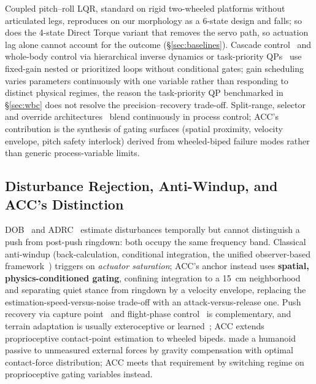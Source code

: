 \documentclass{jcd}
\begin{document}
Coupled pitch--roll LQR, standard on rigid two-wheeled platforms without articulated legs, reproduces on our morphology as a 6-state design and falls; so does the 4-state Direct Torque variant that removes the servo path, so actuation lag alone cannot account for the outcome (\S\ref{sec:baselines}). Cascade control~\citep{cascade_standard} and whole-body control via hierarchical inverse dynamics or task-priority QPs~\citep{herzog2016wbc} use fixed-gain nested or prioritized loops without conditional gates; gain scheduling~\citep{gain_scheduling_survey} varies parameters continuously with one variable rather than responding to distinct physical regimes, the reason the task-priority QP benchmarked in \S\ref{sec:wbc} does not resolve the precision--recovery trade-off. Split-range, selector and override architectures~\citep{astrom2005advanced} blend continuously in process control; ACC's contribution is the synthesis of gating surfaces (spatial proximity, velocity envelope, pitch safety interlock) derived from wheeled-biped failure modes rather than generic process-variable limits.

\subsection{Disturbance Rejection, Anti-Windup, and ACC's Distinction}
\label{sec:related_dist}
DOB~\citep{ohnishi1993dob} and ADRC~\citep{han2009adrc} estimate disturbances temporally but cannot distinguish a push from post-push ringdown: both occupy the same frequency band. Classical anti-windup (back-calculation, conditional integration, the unified observer-based framework~\citep{astrom1989windup}) triggers on \emph{actuator saturation}; ACC's anchor instead uses \textbf{spatial, physics-conditioned gating}, confining integration to a \SI{15}{cm} neighborhood and separating quiet stance from ringdown by a velocity envelope, replacing the estimation-speed-versus-noise trade-off with an attack-versus-release one. Push recovery via capture point~\citep{englsberger2015dcm} and flight-phase control~\citep{roscia2023flight} is complementary, and terrain adaptation is usually exteroceptive or learned~\citep{lee2020challenging}; ACC extends proprioceptive contact-point estimation to wheeled bipeds. \citet{hyon2007gated} made a humanoid passive to unmeasured external forces by gravity compensation with optimal contact-force distribution; ACC meets that requirement by switching regime on proprioceptive gating variables instead.

\end{document}

